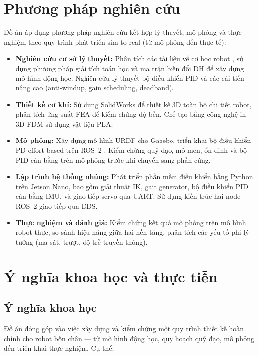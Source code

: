 \section{Phương pháp nghiên cứu}

Đồ án áp dụng phương pháp nghiên cứu kết hợp lý thuyết, mô phỏng và thực nghiệm theo quy trình phát triển sim-to-real (từ mô phỏng đến thực tế):

\begin{itemize}
    \item \textbf{Nghiên cứu cơ sở lý thuyết:} Phân tích các tài liệu về cơ học robot \cite{siciliano2009, craig2005, spong2020}, sử dụng phương pháp giải tích toán học và ma trận biến đổi DH để xây dựng mô hình động học. Nghiên cứu lý thuyết bộ điều khiển PID và các cải tiến nâng cao (anti-windup, gain scheduling, deadband).

    \item \textbf{Thiết kế cơ khí:} Sử dụng SolidWorks để thiết kế 3D toàn bộ chi tiết robot, phân tích ứng suất FEA để kiểm chứng độ bền. Chế tạo bằng công nghệ in 3D FDM sử dụng vật liệu PLA.

    \item \textbf{Mô phỏng:} Xây dựng mô hình URDF cho Gazebo, triển khai bộ điều khiển PD effort-based trên ROS~2 \cite{ros2docs, gazebo}. Kiểm chứng quỹ đạo, mô-men, ổn định và bộ PID cân bằng trên mô phỏng trước khi chuyển sang phần cứng.

    \item \textbf{Lập trình hệ thống nhúng:} Phát triển phần mềm điều khiển bằng Python trên Jetson Nano, bao gồm giải thuật IK, gait generator, bộ điều khiển PID cân bằng IMU, và giao tiếp servo qua UART. Sử dụng kiến trúc hai node ROS~2 giao tiếp qua DDS.

    \item \textbf{Thực nghiệm và đánh giá:} Kiểm chứng kết quả mô phỏng trên mô hình robot thực, so sánh hiệu năng giữa hai nền tảng, phân tích các yếu tố phi lý tưởng (ma sát, trượt, độ trễ truyền thông).
\end{itemize}

\section{Ý nghĩa khoa học và thực tiễn}

\subsection{Ý nghĩa khoa học}
Đồ án đóng góp vào việc xây dựng và kiểm chứng một quy trình thiết kế hoàn chỉnh cho robot bốn chân --- từ mô hình động học, quy hoạch quỹ đạo, mô phỏng đến triển khai thực nghiệm. Cụ thể:


